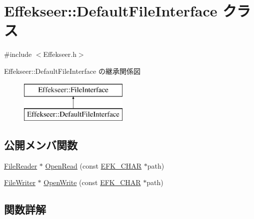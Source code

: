 \hypertarget{class_effekseer_1_1_default_file_interface}{}\section{Effekseer\+:\+:Default\+File\+Interface クラス}
\label{class_effekseer_1_1_default_file_interface}


{\ttfamily \#include $<$Effekseer.\+h$>$}

Effekseer\+:\+:Default\+File\+Interface の継承関係図\begin{figure}[H]
\begin{center}
\leavevmode
\includegraphics[height=2.000000cm]{class_effekseer_1_1_default_file_interface}
\end{center}
\end{figure}
\subsection*{公開メンバ関数}
\begin{DoxyCompactItemize}
\item 
\mbox{\hyperlink{class_effekseer_1_1_file_reader}{File\+Reader}} $\ast$ \mbox{\hyperlink{class_effekseer_1_1_default_file_interface_a03d6224d1eb0124a21f42c578e447d51}{Open\+Read}} (const \mbox{\hyperlink{_effekseer_8h_a50b026abea014b47854bcd835b3b6233}{E\+F\+K\+\_\+\+C\+H\+AR}} $\ast$path)
\item 
\mbox{\hyperlink{class_effekseer_1_1_file_writer}{File\+Writer}} $\ast$ \mbox{\hyperlink{class_effekseer_1_1_default_file_interface_aecbcd4350ca701360dcea88a2c5f9c64}{Open\+Write}} (const \mbox{\hyperlink{_effekseer_8h_a50b026abea014b47854bcd835b3b6233}{E\+F\+K\+\_\+\+C\+H\+AR}} $\ast$path)
\end{DoxyCompactItemize}


\subsection{関数詳解}
\mbox{\label{class_effekseer_1_1_default_file_interface_a03d6224d1eb0124a21f42c578e447d51}} 
